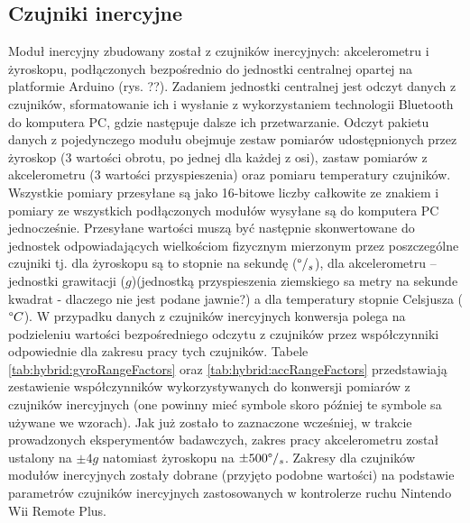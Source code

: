 \subsection{Czujniki inercyjne}
Moduł inercyjny zbudowany został z czujników inercyjnych: akcelerometru i żyroskopu, podłączonych bezpośrednio do jednostki centralnej opartej na platformie Arduino (rys. ??). Zadaniem jednostki centralnej jest odczyt danych z czujników, sformatowanie ich i wysłanie z wykorzystaniem technologii Bluetooth do komputera PC, gdzie następuje dalsze ich przetwarzanie. Odczyt pakietu danych z pojedynczego modułu obejmuje zestaw pomiarów udostępnionych przez żyroskop (3 wartości obrotu, po jednej dla każdej z osi), zastaw pomiarów z akcelerometru (3 wartości przyspieszenia) oraz pomiaru temperatury czujników. Wszystkie pomiary przesyłane są jako 16-bitowe liczby całkowite ze znakiem i pomiary ze wszystkich podłączonych modułów wysyłane są do komputera PC jednocześnie. Przesyłane wartości muszą być następnie skonwertowane do jednostek odpowiadających wielkościom fizycznym mierzonym przez poszczególne czujniki tj. dla żyroskopu są to stopnie na sekundę ($\degree/_s$), dla akcelerometru -- jednostki grawitacji ($g$)(jednostką przyspieszenia ziemskiego sa metry na sekunde kwadrat - dlaczego nie jest podane jawnie?)  a dla temperatury stopnie Celsjusza ($\degree C$). W przypadku danych z czujników inercyjnych konwersja polega na podzieleniu wartości bezpośredniego odczytu z czujników przez współczynniki odpowiednie dla zakresu pracy tych czujników. Tabele \ref{tab:hybrid:gyroRangeFactors} oraz \ref{tab:hybrid:accRangeFactors} przedstawiają zestawienie współczynników wykorzystywanych do konwersji pomiarów z czujników inercyjnych (one powinny mieć symbole skoro później te symbole sa używane we wzorach). Jak już zostało to zaznaczone wcześniej, w trakcie prowadzonych eksperymentów badawczych, zakres pracy akcelerometru został ustalony na $\pm4g$ natomiast żyroskopu na $\pm500\degree/_s$. Zakresy dla czujników modułów inercyjnych zostały dobrane (przyjęto podobne wartości) na podstawie parametrów czujników inercyjnych zastosowanych w kontrolerze ruchu Nintendo Wii Remote Plus.

